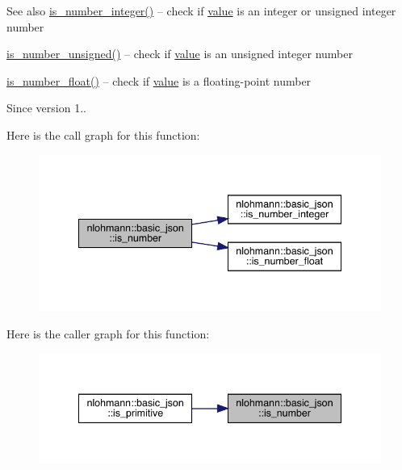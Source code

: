 \begin{DoxySeeAlso}{See also}
\mbox{\hyperlink{classnlohmann_1_1basic__json_abac8af76067f1e8fdca9052882c74428}{is\+\_\+number\+\_\+integer()}} -- check if \mbox{\hyperlink{classnlohmann_1_1basic__json_af9c51328fbe1da75eca750be3009917a}{value}} is an integer or unsigned integer number 

\mbox{\hyperlink{classnlohmann_1_1basic__json_abc7378cba0613a78b9aad1c8e7044bb0}{is\+\_\+number\+\_\+unsigned()}} -- check if \mbox{\hyperlink{classnlohmann_1_1basic__json_af9c51328fbe1da75eca750be3009917a}{value}} is an unsigned integer number 

\mbox{\hyperlink{classnlohmann_1_1basic__json_a33b4bf898b857c962e798fc7f6e86e70}{is\+\_\+number\+\_\+float()}} -- check if \mbox{\hyperlink{classnlohmann_1_1basic__json_af9c51328fbe1da75eca750be3009917a}{value}} is a floating-\/point number
\end{DoxySeeAlso}
\begin{DoxySince}{Since}
version 1.. 
\end{DoxySince}
Here is the call graph for this function\+:
\nopagebreak
\begin{figure}[H]
\begin{center}
\leavevmode
\includegraphics[width=341pt]{classnlohmann_1_1basic__json_a2b9852390abb4b1ef5fac6984e2fc0f3_cgraph}
\end{center}
\end{figure}
Here is the caller graph for this function\+:
\nopagebreak
\begin{figure}[H]
\begin{center}
\leavevmode
\includegraphics[width=341pt]{classnlohmann_1_1basic__json_a2b9852390abb4b1ef5fac6984e2fc0f3_icgraph}
\end{center}
\end{figure}
